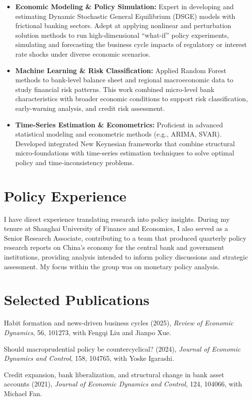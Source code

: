 \documentclass[11pt]{article}
\begin{document}
\begin{itemize}
    \item \textbf{Economic Modeling \& Policy Simulation:} Expert in developing and estimating Dynamic Stochastic General Equilibrium (DSGE) models with frictional banking sectors. Adept at applying nonlinear and perturbation solution methods to run high-dimensional ``what-if'' policy experiments, simulating and forecasting the business cycle impacts of regulatory or interest rate shocks under diverse economic scenarios.
    \item \textbf{Machine Learning \& Risk Classification:} Applied Random Forest methods to bank-level balance sheet and regional macroeconomic data to study financial risk patterns. This work combined micro-level bank characteristics with broader economic conditions to support risk classification, early-warning analysis, and credit risk assessment.
    \item \textbf{Time-Series Estimation \& Econometrics:} Proficient in advanced statistical modeling and econometric methods (e.g., ARIMA, SVAR). Developed integrated New Keynesian frameworks that combine structural micro-foundations with time-series estimation techniques to solve optimal policy and time-inconsistency problems.
\end{itemize}

\section*{Policy Experience}

I have direct experience translating research into policy insights.
During my tenure at Shanghai University of Finance and Economics, I also served as a Senior Research Associate, contributing to a team that produced quarterly policy research reports on China's economy for the central bank and government institutions, providing analysis intended to inform policy discussions and strategic assessment.
My focus within the group was on monetary policy analysis.

\section*{Selected Publications}

\begin{enumerate}[label={[\arabic*]}]
\item{Habit formation and news-driven business cycles (2025), \textit{Review of Economic Dynamics}, 56, 101273,  with Fengqi Liu and Jianpo Xue.}
\item{Should macroprudential policy be countercyclical? (2024), \textit{Journal of Economic Dynamics and Control}, 158, 104765,  with Yoske Igarashi.}
\item {Credit expansion, bank liberalization, and structural change in bank asset accounts (2021), \textit{Journal of Economic Dynamics and Control}, 124, 104066, with Michael Fan.} 
\end{enumerate}
\end{document}
